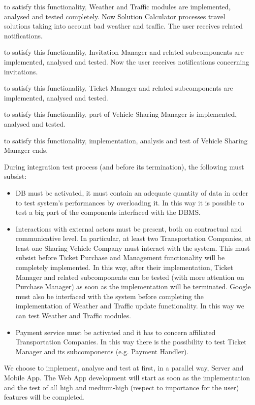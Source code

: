 \begin{description}[before={\renewcommand{\makelabel}[1]{ \textbf{\textit{##1}}:}}]
	\item[8. Wheather \& traffic updates] to satisfy this functionality, Weather and Traffic modules are implemented, analysed and tested completely. Now Solution Calculator processes travel solutions taking into account bad weather and traffic. The user receives related notifications.
	\item[9. Invitations] to satisfy this functionality, Invitation Manager and related subcomponents are implemented, analysed and tested. Now the user receives notifications concerning invitations.
	\item[10. Ticket purchase and management] to satisfy this functionality, Ticket Manager and related subcomponents are implemented, analysed and tested.
	\item[11. Rent a sharing vehicle] to satisfy this functionality, part of Vehicle Sharing Manager is implemented, analysed and tested.
	\item[12. Localization sharing vehicle] to satisfy this functionality, implementation, analysis and test of Vehicle Sharing Manager ends.\newline		
\end{description} \bigskip
\noindent
During integration test process (and before its termination), the following must subsist:
\begin{itemize}
	\item DB must be activated, it must contain an adequate quantity of data in order to test system's performances by overloading it. In this way it is possible to test a big part of the components interfaced with the DBMS.
	\item Interactions with external actors must be present, both on contractual and communicative level. In particular, at least two Transportation Companies, at least one Sharing Vehicle Company must interact with the system. This must subsist before Ticket Purchase and Management functionality will be completely implemented.  In this way, after their implementation, Ticket Manager and related subcomponents can be tested (with more attention on Purchase Manager) as soon as the implementation will be terminated. 
	Google must also be interfaced with the system before completing the implementation of Weather and Traffic update functionality. In this way we can test Weather and Traffic modules. 
	\item Payment service must be activated and it has to concern affiliated Transportation Companies. In this way there is the possibility to test Ticket Manager and its subcomponents (e.g. Payment Handler). \newline	
\end{itemize} 
\bigskip 
We choose to implement, analyse and test at first, in a parallel way, Server and Mobile App. The Web App development will start as soon as the implementation and the test of all high and medium-high (respect to importance for the user) features will be completed.